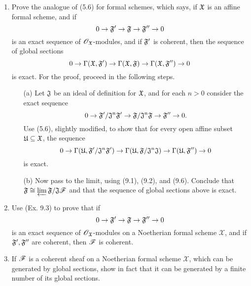 \documentclass{article}
\begin{document}
\begin{enumerate} [label=\textbf{\arabic*.}, leftmargin=0em]
\item Prove the analogue of (5.6) for formal schemes, which says, if $\mathfrak{X}$ is an affine formal scheme, and if
\begin{equation*}
    0 \to \mathfrak{F}' \to \mathfrak{F} \to \mathfrak{F}'' \to 0
\end{equation*}
is an exact sequence of $\mathscr{O}_{\mathfrak{X}}$-modules, and if $\mathfrak{F}'$ is coherent, then the sequence of global sections
\begin{equation*}
    0 \to \Gamma(\mathfrak{X}, \mathfrak{F}') \to \Gamma(\mathfrak{X}, \mathfrak{F}) \to \Gamma(\mathfrak{X}, \mathfrak{F}'') \to 0
\end{equation*}
is exact. For the proof, proceed in the following steps.
\begin{itemize}
    \item[(a)] Let $\mathfrak{J}$ be an ideal of definition for $\mathfrak{X}$, and for each $n > 0$ consider the exact sequence
    \begin{equation*}
        0 \to \mathfrak{F}'/\mathfrak{J}^n \mathfrak{F}' \to \mathfrak{F} / \mathfrak{J}^n \mathfrak{F} \to \mathfrak{F}'' \to 0.
    \end{equation*}
    Use (5.6), slightly modified, to show that for every open affine subset $\mathfrak{U} \subseteq \mathfrak{X}$, the sequence
    \begin{equation*}
        0 \to \Gamma(\mathfrak{U}, \mathfrak{F}'/\mathfrak{J}^n \mathfrak{F}') \to \Gamma(\mathfrak{U}, \mathfrak{F}/\mathfrak{J}^n \mathfrak{J}) \to \Gamma(\mathfrak{U}, \mathfrak{F}'') \to 0
    \end{equation*}
    is exact.
    \item[(b)] Now pass to the limit, using (9.1), (9.2), and (9.6). Conclude that $\mathfrak{F} \cong \varprojlim \mathfrak{F} / \mathfrak{J} \mathscr{F}$ and that the sequence of global sections above is exact.
\end{itemize}

\item Use (Ex. 9.3) to prove that if
\begin{equation*}
    0 \to \mathfrak{F}' \to \mathfrak{F} \to \mathfrak{F}'' \to 0
\end{equation*}
is an exact sequence of $\mathscr{O}_{\mathfrak{X}}$-modules on a Noetherian formal scheme $\mathscr{X}$, and if $\mathfrak{F}', \mathfrak{F}''$ are coherent, then $\mathscr{F}$ is coherent.

\item If $\mathscr{F}$ is a coherent sheaf on a Noetherian formal scheme $\mathscr{X}$, which can be generated by global sections, show in fact that it can be generated by a finite number of its global sections.


\end{enumerate}
\end{document}
